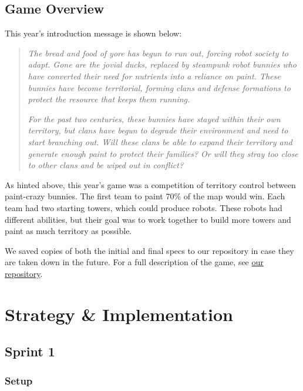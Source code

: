 \documentclass{article}
\begin{document}
  \subsection{Game Overview}

  This year's introduction message is shown below:

  \begin{quote}
    \textit{The bread and food of yore has begun to run out, forcing robot society to adapt. Gone are the jovial ducks, replaced by steampunk robot bunnies who have converted their need for nutrients into a reliance on paint. These bunnies have become territorial, forming clans and defense formations to protect the resource that keeps them running.}
    
    \medskip
    
    \textit{For the past two centuries, these bunnies have stayed within their own territory, but clans have begun to degrade their environment and need to start branching out. Will these clans be able to expand their territory and generate enough paint to protect their families? Or will they stray too close to other clans and be wiped out in conflict?}
  \end{quote}

  As hinted above, this year's game was a competition of territory control between paint-crazy bunnies. The first team to paint 70\% of the map would win. Each team had two starting towers, which could produce robots. These robots had different abilities, but their goal was to work together to build more towers and paint as much territory as possible.

  \medskip

  We saved copies of both the initial and final specs to our repository in case they are taken down in the future. For a full description of the game, see \href{https://github.com/justinottesen/battlecode25}{our repository}.

  \section{Strategy \& Implementation}

  \subsection{Sprint 1}

  \subsubsection{Setup}
\end{document}
